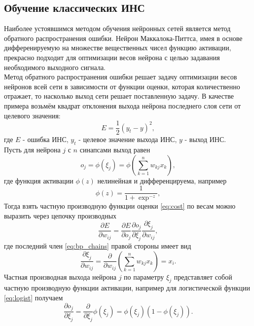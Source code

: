 \documentclass[a4paper,10pt]{article}
\begin{document}
\subsection{Обучение классических ИНС}
\indent Наиболее устоявшимся методом обучения нейронных сетей является метод обратного распространения ошибки. Нейрон Маккалока-Питтса, имея в основе дифференируемую на множестве вещественных чисел функцию активации, прекрасно подходит для оптимизации весов нейрона с целью задавания необходимого выходного сигнала.\\  
\indent Метод обратного распространения ошибки решает задачу оптимизации весов нейронов всей сети в зависимости от функции оценки, которая количественно отражает, то насколько выход сети решает поставленную задачу. В качестве примера возьмём квадрат отклонения выхода нейрона последнего слоя сети от целевого значения:
\begin{equation}\label{eq:cost}
E = \frac{1}{2}(y_{t}-y)^2,
\end{equation} 
где $E$ - ошибка ИНС, $y_{t}$ - целевое значение выхода ИНС, $y$ - выход ИНС.\\
\indent Пусть для нейрона $j$ с $n$ синапсами выход равен
\begin{equation*}
o_{j}=\phi (\xi_{j}) = \phi \left(\sum_{k=1}^{n}w_{kj}x_{k}\right),
\end{equation*}
где функция активации $\phi(z)$ нелинейная и дифференцируема, например
\begin{equation}\label{eq:logist}
\phi(z)=\frac{1}{1+\exp^{-z}},
\end{equation}
\indent Тогда взять частную производную функции оценки \eqref{eq:cost} по весам можно выразить через цепочку производных
\begin{equation}\label{eq:bp_chains}
\frac{\partial E}{\partial w_{ij}} = \frac{\partial E}{\partial o_{j}} \frac{{\partial o_{j}}}{\partial \xi_j} \frac{\partial \xi_j}{\partial w_{ij}},
\end{equation}
где последний член \eqref{eq:bp_chains} правой стороны имеет вид
\begin{equation*}
\frac{{\partial \xi_{j}}}{\partial w_{ij}} = \frac{\partial}{\partial w_{ij}} \left(\sum_{k=1}^{n}w_{kj}x_{k}\right) = x_{i}.
\end{equation*}
\indent Частная производная выхода нейрона $j$ по параметру $\xi_{j}$ представляет собой частную производную функции активации, например для логистической функции \eqref{eq:logist} получаем
\begin{equation*}
\frac{{\partial o_{j}}}{\partial \xi_{j}} = \frac{\partial}{\partial \xi_{j}} \phi(\xi_{j}) = \phi(\xi_{j})(1-\phi(\xi_{j})).
\end{equation*}
\end{document}
